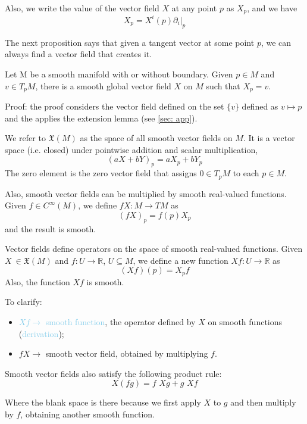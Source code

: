 \documentclass[a4paper,12pt,reqno]{amsbook}
\theoremstyle{definition} %
\newcommand{\1}{\mathbbm{1}}
\newcommand{\R}{\ensuremath{\mathbb{R}}}
\theoremstyle{plain}
\theoremstyle{remark}
\begin{document}
Also, we write the value of the vector field $X$ at any point $p$ as $X_p$, and we have \[X_p = X^i (p) \partial_i|_p\]


The next proposition says that given a tangent vector at some point $p$, we can always find a vector field that creates it.
\begin{proposition}
    Let M be a smooth manifold with or without boundary. Given $p\in M$ and $v \in T_pM$, there is a smooth global vector field $X$ on $M$ such that $X_p=v$.

    Proof: the proof considers the vector field defined on the set $\{v\}$ defined as $v\mapsto p$ and the applies the extension lemma (see \ref{sec: app}). 
\end{proposition}

We refer to $\mathfrak{X}(M)$ as the space of all smooth vector fields on $M$. It is a vector space (i.e. closed) under  pointwise addition and scalar multiplication,
\[
(aX + bY)_p = aX_p + bY_p
\]
The zero element is the zero vector field that assigns $0 \in T_pM$ to each $p \in M$. 

Also, smooth vector fields can be multiplied by smooth real-valued functions. Given $f \in C^\infty(M)$, we define $fX: M \to TM$ as \[
(fX)_p = f(p)X_p
\] and the result is smooth. 


Vector fields define operators on the space of smooth real-valued functions. Given $X\ \in \mathfrak{X}(M)$ and $f:U \to \R$, $U\subseteq M$, we define a new function $Xf : U \to \R$ as
\[
(Xf)(p) = X_pf
\]
Also, the function $Xf$ is smooth. 


To clarify: 
    \begin{itemize}
        \item[] \textcolor{SkyBlue}{$Xf \longrightarrow$ smooth function}, the operator defined by $X$ on smooth functions (\textcolor{SkyBlue}{derivation});
        \item[] \textcolor{OliveGreen}{$fX \longrightarrow$ smooth vector field}, obtained by \textcolor{OliveGreen}{multiplying $f$}.
    \end{itemize}

Smooth vector fields also satisfy the following product rule:
\begin{equation}\label{eq: prule}
    X(fg) = f\, \,Xg + g\, \,Xf
\end{equation}

Where the blank space is there because we first apply $X$ to $g$ and then multiply by $f$, obtaining another smooth function. 
\end{document}
